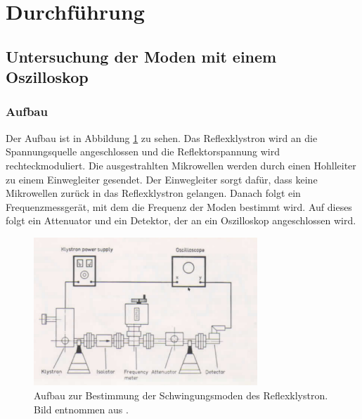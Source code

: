 \section{Durchführung}
\label{sec:Durchführung}

\subsection{Untersuchung der Moden mit einem Oszilloskop}
\subsubsection{Aufbau}
Der Aufbau ist in Abbildung \ref{fig:moden_aufbau} zu sehen.
Das Reflexklystron wird an die Spannungsquelle angeschlossen und die Reflektorspannung wird rechteckmoduliert.
Die ausgestrahlten Mikrowellen werden durch einen Hohlleiter zu einem Einwegleiter gesendet.
Der Einwegleiter sorgt dafür, dass keine Mikrowellen zurück in das Reflexklystron gelangen.
Danach folgt ein Frequenzmessgerät, mit dem die Frequenz der Moden bestimmt wird.
Auf dieses folgt ein Attenuator und ein Detektor, der an ein Oszilloskop angeschlossen wird.

\begin{figure}
    \centering
    \includegraphics[width=0.75\textwidth]{content/data/Aufbau_Moden.png}
    \caption{Aufbau zur Bestimmung der Schwingungsmoden des Reflexklystron. Bild entnommen aus \cite[8]{Anleitung}.}
    \label{fig:moden_aufbau}
\end{figure}

